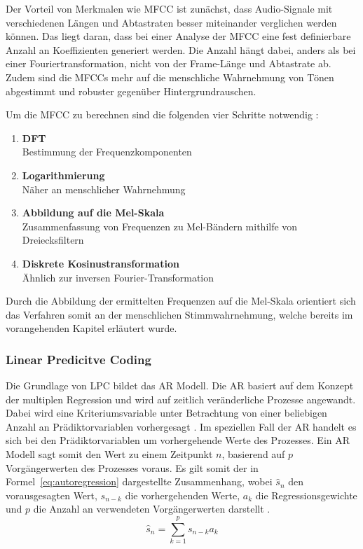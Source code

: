 Der Vorteil von Merkmalen wie \ac{MFCC} ist zunächst, dass Audio-Signale mit verschiedenen Längen und Abtastraten besser miteinander verglichen werden können.
Das liegt daran, dass bei einer Analyse der \ac{MFCC} eine fest definierbare Anzahl an Koeffizienten generiert werden.
Die Anzahl hängt dabei, anders als bei einer Fouriertransformation, nicht von der Frame-Länge und Abtastrate ab.
Zudem sind die \acp{MFCC} mehr auf die menschliche Wahrnehmung von Tönen abgestimmt und robuster gegenüber Hintergrundrauschen.

Um die \ac{MFCC} zu berechnen sind die folgenden vier Schritte notwendig \autocite[vgl. ][S. 2]{logan_mel_2000}:

\begin{enumerate}
    \item \textbf{\ac{DFT}}\\Bestimmung der Frequenzkomponenten
    \item \textbf{Logarithmierung}\\Näher an menschlicher Wahrnehmung
    \item \textbf{Abbildung auf die Mel-Skala}\\Zusammenfassung von Frequenzen zu Mel-Bändern mithilfe von Dreiecksfiltern
    \item \textbf{Diskrete Kosinustransformation}\\Ähnlich zur inversen Fourier-Transformation
\end{enumerate}

Durch die Abbildung der ermittelten Frequenzen auf die Mel-Skala orientiert sich das Verfahren somit an der menschlichen Stimmwahrnehmung, welche bereits im vorangehenden Kapitel erläutert wurde.

\subsubsection{Linear Predicitve Coding}
Die Grundlage von \ac{LPC} bildet das \ac{AR} Modell.
Die \ac{AR} basiert auf dem Konzept der multiplen Regression und wird auf zeitlich veränderliche Prozesse angewandt.
Dabei wird eine Kriteriumsvariable unter Betrachtung von einer beliebigen Anzahl an Prädiktorvariablen vorhergesagt \autocite[vgl.][S. 37-38]{canela_multiple_2019}.
Im speziellen Fall der \ac{AR} handelt es sich bei den Prädiktorvariablen um vorhergehende Werte des Prozesses.
Ein \ac{AR} Modell sagt somit den Wert zu einem Zeitpunkt $n$, basierend auf $p$ Vorgängerwerten des Prozesses voraus.
Es gilt somit der in Formel~\ref{eq:autoregression} dargestellte Zusammenhang, wobei $\hat{s}_n$ den vorausgesagten Wert, $s_{n-k}$ die vorhergehenden Werte, $a_{k}$ die Regressionsgewichte und $p$ die Anzahl an verwendeten Vorgängerwerten darstellt \autocite[][S. 1304]{atal_effectiveness_1974}.
\begin{equation}
  \hat{s}_{n} = \sum_{k=1}^{p} s_{n-k}a_{k}
  \label{eq:autoregression}
\end{equation}

